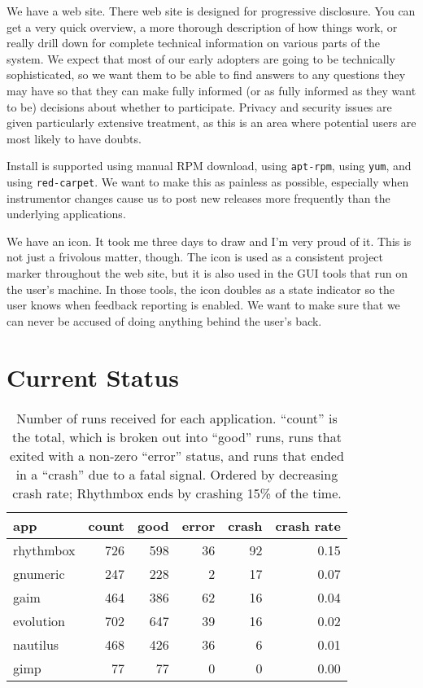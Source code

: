 \documentclass[10pt,twocolumn]{article}
\begin{document}
We have a web site.  There web site is designed for progressive
disclosure.  You can get a very quick overview, a more thorough
description of how things work, or really drill down for complete
technical information on various parts of the system.  We expect that
most of our early adopters are going to be technically sophisticated,
so we want them to be able to find answers to any questions they may
have so that they can make fully informed (or as fully informed as
they want to be) decisions about whether to participate.  Privacy and
security issues are given particularly extensive treatment, as this is
an area where potential users are most likely to have doubts.

Install is supported using manual RPM download, using
\texttt{apt-rpm}, using \texttt{yum}, and using \texttt{red-carpet}.
We want to make this as painless as possible, especially when
instrumentor changes cause us to post new releases more frequently
than the underlying applications.

We have an icon.  It took me three days to draw and I'm very proud of
it.  This is not just a frivolous matter, though.  The icon is used as
a consistent project marker throughout the web site, but it is also
used in the GUI tools that run on the user's machine.  In those tools,
the icon doubles as a state indicator so the user knows when feedback
reporting is enabled.  We want to make sure that we can never be
accused of doing anything behind the user's back.

\section{Current Status}

\begin{table}
  \begin{tabular}{lrrrrr}
    app & count & good & error & crash & crash rate \\ \hline
    rhythmbox & 726 & 598 & 36 & 92 & 0.15 \\
    gnumeric & 247 & 228 & 2 & 17 & 0.07 \\
    gaim & 464 & 386 & 62 & 16 & 0.04 \\
    evolution & 702 & 647 & 39 & 16 & 0.02 \\
    nautilus & 468 & 426 & 36 & 6 & 0.01 \\
    gimp & 77 & 77 & 0 & 0 & 0.00
  \end{tabular}
  \caption{Number of runs received for each application.  ``count'' is
    the total, which is broken out into ``good'' runs, runs that
    exited with a non-zero ``error'' status, and runs that ended in a
    ``crash'' due to a fatal signal.  Ordered by decreasing crash
    rate; Rhythmbox ends by crashing 15\% of the time.}
  \label{reports-per-app}
\end{table}
\end{document}

